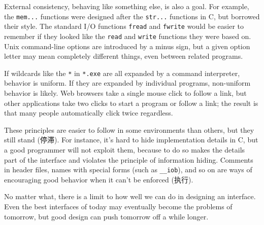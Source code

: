 External consistency, behaving like something else, is also a goal. For
example, the \verb'mem...' functions were designed after the \verb'str...'
functions in C, but borrowed their style. The standard I/O functions
\verb'fread' and \verb'fwrite' would be easier to remember if they looked
like the \verb'read' and \verb'write' functions they were based on. Unix
command-line options are introduced by a minus sign, but a given option
letter may mean completely different things, even between related programs.

If wildcards like the \verb'*' in \verb'*.exe' are all expanded by a
command interpreter, behavior is uniform. If they are expanded by
individual programs, non-uniform behavior is likely. Web browsers take a
single mouse click to follow a link, but other applications take two clicks
to start a program or follow a link; the result is that many people
automatically click twice regardless.

These principles are easier to follow in some environments than others, but
they still stand (停滞). For instance, it's hard to hide implementation
details in C, but a good programmer will not exploit them, because to do so
makes the details part of the interface and violates the principle of
information hiding. Comments in header files, names with special forms
(such as \verb'__iob'), and so on are ways of encouraging good behavior
when it can't be enforced (执行).

No matter what, there is a limit to how well we can do in designing an
interface.  Even the best interfaces of today may eventually become the
problems of tomorrow, but good design can push tomorrow off a while longer.
